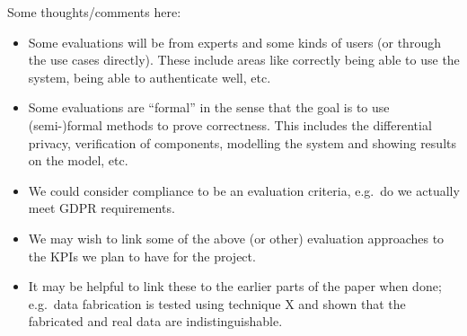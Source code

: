 
{\color{purple}
Some thoughts/comments here:
\begin{itemize}
    \item Some evaluations will be from experts and some kinds of users (or through the use cases directly). These include areas like correctly being able to use the system, being able to authenticate well, etc.
    \item Some evaluations are ``formal'' in the sense that the goal is to use (semi-)formal methods to prove correctness. This includes the differential privacy, verification of components, modelling the system and showing results on the model, etc.
    \item We could consider compliance to be an evaluation criteria, e.g.~do we actually meet GDPR requirements.
    \item We may wish to link some of the above (or other) evaluation approaches to the KPIs we plan to have for the project.
    \item It may be helpful to link these to the earlier parts of the paper when done; e.g.~data fabrication is tested using technique X and shown that the fabricated and real data are indistinguishable.
\end{itemize}}
